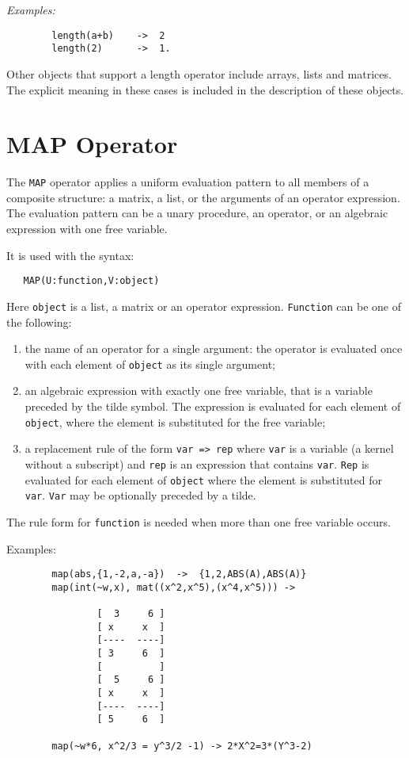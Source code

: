 \textit{Examples:}
\begin{verbatim}
        length(a+b)    ->  2
        length(2)      ->  1.
\end{verbatim}
Other objects that support a length operator include arrays, lists and
matrices. The explicit meaning in these cases is included in the description
of these objects.

\section{MAP Operator}
\hypertarget{operator:MAP}{}

The \texttt{MAP} operator applies a uniform evaluation pattern to all members
of a composite structure: a matrix, a list, or the arguments of an
operator expression.  The evaluation pattern can be a unary procedure, an
operator, or an algebraic expression with one free variable.

It is used with the syntax:
\begin{verbatim}
   MAP(U:function,V:object)
\end{verbatim}
Here \texttt{object} is a list, a matrix or an operator expression.
\texttt{Function} can be one of the following:
\begin{enumerate}
\item the name of an operator for a single argument: the operator
is evaluated once with each element of \texttt{object} as its single argument;
\item an algebraic expression with exactly one free variable, that is
a variable preceded by the tilde symbol. The expression
is evaluated for each element of \texttt{object}, where the element is
substituted for the free variable;
\item a replacement rule of the form \texttt{var => rep}
where \texttt{var} is a variable (a kernel without a subscript)
and \texttt{rep} is an expression that contains \texttt{var}.
\texttt{Rep} is evaluated for each element of \texttt{object} where
the element is substituted for  \texttt{var}. \texttt{Var} may be
optionally preceded by a tilde.
\end{enumerate}
The rule form  for \texttt{function} is needed when more than
one free variable occurs.

Examples:
\begin{verbatim}
        map(abs,{1,-2,a,-a})  ->  {1,2,ABS(A),ABS(A)}
        map(int(~w,x), mat((x^2,x^5),(x^4,x^5))) ->

                [  3     6 ]
                [ x     x  ]
                [----  ----]
                [ 3     6  ]
                [          ]
                [  5     6 ]
                [ x     x  ]
                [----  ----]
                [ 5     6  ]

        map(~w*6, x^2/3 = y^3/2 -1) -> 2*X^2=3*(Y^3-2)
\end{verbatim}

